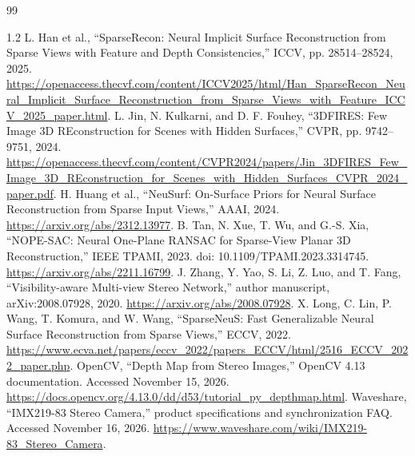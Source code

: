 \clearpage
\renewcommand{\bibname}{References}
\begin{thebibliography}{99}
\begin{spacing}{1.2}
 L. Han et al., ``SparseRecon: Neural Implicit Surface Reconstruction from Sparse Views with Feature and Depth Consistencies,'' ICCV, pp. 28514--28524, 2025. \url{https://openaccess.thecvf.com/content/ICCV2025/html/Han_SparseRecon_Neural_Implicit_Surface_Reconstruction_from_Sparse_Views_with_Feature_ICCV_2025_paper.html}.
 L. Jin, N. Kulkarni, and D. F. Fouhey, ``3DFIRES: Few Image 3D REconstruction for Scenes with Hidden Surfaces,'' CVPR, pp. 9742--9751, 2024. \url{https://openaccess.thecvf.com/content/CVPR2024/papers/Jin_3DFIRES_Few_Image_3D_REconstruction_for_Scenes_with_Hidden_Surfaces_CVPR_2024_paper.pdf}.
 H. Huang et al., ``NeuSurf: On-Surface Priors for Neural Surface Reconstruction from Sparse Input Views,'' AAAI, 2024. \url{https://arxiv.org/abs/2312.13977}.
 B. Tan, N. Xue, T. Wu, and G.-S. Xia, ``NOPE-SAC: Neural One-Plane RANSAC for Sparse-View Planar 3D Reconstruction,'' IEEE TPAMI, 2023. doi: 10.1109/TPAMI.2023.3314745. \url{https://arxiv.org/abs/2211.16799}.
 J. Zhang, Y. Yao, S. Li, Z. Luo, and T. Fang, ``Visibility-aware Multi-view Stereo Network,'' author manuscript, arXiv:2008.07928, 2020. \url{https://arxiv.org/abs/2008.07928}.
 X. Long, C. Lin, P. Wang, T. Komura, and W. Wang, ``SparseNeuS: Fast Generalizable Neural Surface Reconstruction from Sparse Views,'' ECCV, 2022. \url{https://www.ecva.net/papers/eccv_2022/papers_ECCV/html/2516_ECCV_2022_paper.php}.
 OpenCV, ``Depth Map from Stereo Images,'' OpenCV 4.13 documentation. Accessed November 15, 2026. \url{https://docs.opencv.org/4.13.0/dd/d53/tutorial_py_depthmap.html}.
 Waveshare, ``IMX219-83 Stereo Camera,'' product specifications and synchronization FAQ. Accessed November 16, 2026. \url{https://www.waveshare.com/wiki/IMX219-83_Stereo_Camera}.
\end{spacing}
\end{thebibliography}
